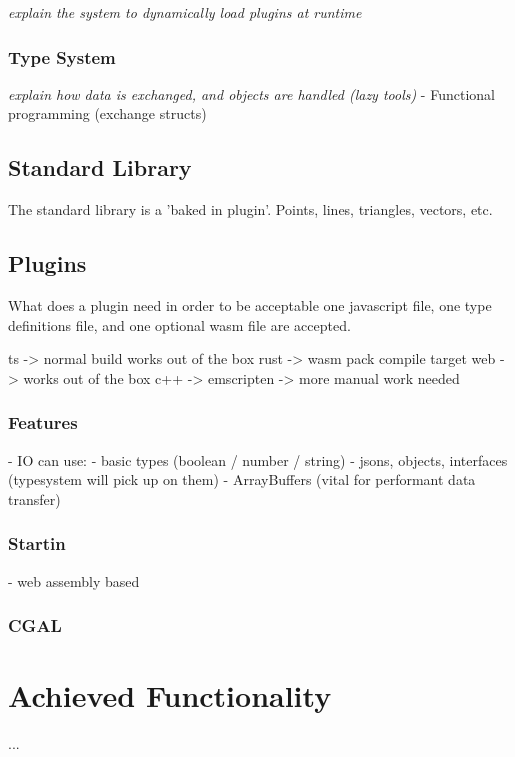 \emph{explain the system to dynamically load plugins at runtime}

\subsubsection{ Type System }

\emph{explain how data is exchanged, and objects are handled (lazy tools)}
- Functional programming (exchange structs)

\subsection{ Standard Library }

The standard library is a 'baked in plugin'.
Points, lines, triangles, vectors, etc.

\subsection{ Plugins }
What does a plugin need in order to be acceptable
one javascript file, one type definitions file, and one optional wasm file are accepted. 

ts -> normal build works out of the box
rust -> wasm pack compile target web -> works out of the box 
c++ -> emscripten -> more manual work needed 

\subsubsection{Features}
- IO can use:
  - basic types (boolean / number / string)
  - jsons, objects, interfaces (typesystem will pick up on them)
  - ArrayBuffers (vital for performant data transfer)






\subsubsection{ Startin }
- web assembly based

\subsubsection{ CGAL }




\section{Achieved Functionality}



...




